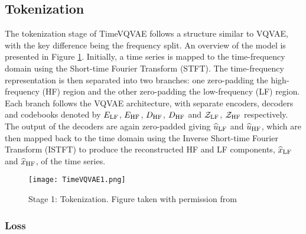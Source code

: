 \documentclass[../../thesis.tex]{subfiles}
\begin{document}
\subsection{Tokenization}
The tokenization stage of TimeVQVAE follows a structure similar to VQVAE, with the key difference being the frequency split. An overview of the model is presented in Figure \ref{fig:TimeVQVAE1}. Initially, a time series is mapped to the time-frequency domain using the Short-time Fourier Transform (STFT). The time-frequency representation is then separated into two branches: one zero-padding the high-frequency (HF) region and the other zero-padding the low-frequency (LF) region. Each branch follows the VQVAE architecture, with separate encoders, decoders and codebooks denoted by $E_{\mathrm{LF}}$, $E_{\mathrm{HF}}$, $D_{\mathrm{HF}}$, $D_{\mathrm{HF}}$ and $\mathcal{Z}_{\mathrm{LF}}$, $\mathcal{Z}_{\mathrm{HF}}$ respectively. The output of the decoders are again zero-padded giving $\widehat{u}_{\mathrm{LF}}$ and $\widehat{u}_{\mathrm{HF}}$, which are then mapped back to the time domain using the Inverse Short-time Fourier Transform (ISTFT) to produce the reconstructed HF and LF components, $\widehat{x}_{\mathrm{LF}}$ and $\widehat{x}_{\mathrm{HF}}$, of the time series.

\begin{figure}[h]
    \texttt{[image: TimeVQVAE1.png]}
    \centering 
    \caption{Stage 1: Tokenization. Figure taken with permission from \cite{TimeVQVAE}}
    \label{fig:TimeVQVAE1}
\end{figure}

\subsubsection{Loss}
\end{document}
